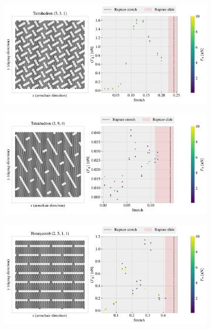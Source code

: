 \begin{figure}[H]
  \centering
  \begin{subfigure}[t]{0.49\textwidth}
      \centering
      \includegraphics[width=\textwidth]{figures/stretch_profiles/PP_pop_27.pdf}
      \caption{}
  \end{subfigure}
  \hfill
  \begin{subfigure}[t]{0.49\textwidth}
      \centering
      \includegraphics[width=\textwidth]{figures/stretch_profiles/PP_pop_31.pdf}
      \caption{}
  \end{subfigure}
  \hfill
  \begin{subfigure}[t]{0.49\textwidth}
      \centering
      \includegraphics[width=\textwidth]{figures/stretch_profiles/PP_hon_6.pdf}

\end{subfigure}
\end{figure}
